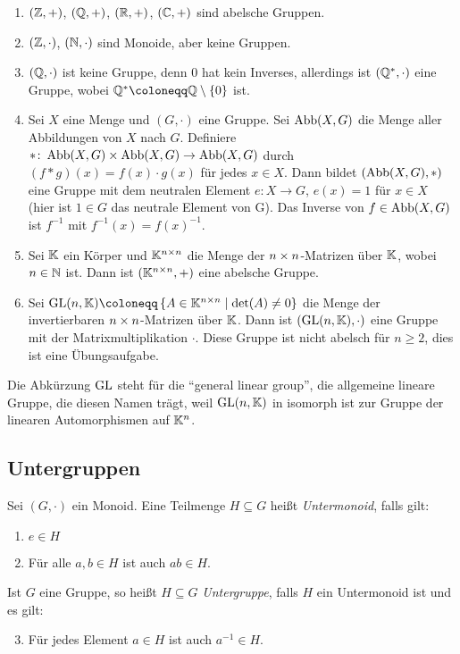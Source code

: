 {\begin{example}
  \leavevmode \vspace{-\baselineskip}
  \begin{enumerate}
    \item $(\mathbb{Z},+)$, $(\mathbb{Q},+)$, $(\mathbb{R},+)$, $(\mathbb{C},+)$ sind abelsche Gruppen.
    \item $(\mathbb{Z},\cdot)$, $(\mathbb{N},\cdot)$ sind Monoide, aber keine Gruppen.
    \item $(\mathbb{Q},\cdot)$ ist keine Gruppe, denn $0$ hat kein Inverses, allerdings ist $(\mathbb{Q}^*,\cdot)$ eine Gruppe, wobei $\QQ^* \coloneqq \QQ \setminus \setdef{0}$ ist.
    \item Sei $X$ eine Menge und $(G,\cdot)$ eine Gruppe. Sei $\operatorname{Abb}(X,G)$ die Menge aller Abbildungen von $X$ nach $G$. Definiere $* \colon \operatorname{Abb}(X,G) \times \operatorname{Abb}(X,G) \rightarrow \operatorname{Abb}(X,G)$ durch $(f * g)(x) = f(x) \cdot g(x)$ für jedes $x \in X$.
    Dann bildet $(\operatorname{Abb}(X,G),*)$ eine Gruppe mit dem neutralen Element $e \colon X \rightarrow G$, $e(x) = 1$ für $x \in X$ (hier ist $1 \in G$ das neutrale Element von G). Das Inverse von $f \in \operatorname{Abb}(X,G)$ ist $f^{-1}$ mit $f^{-1}(x) = f(x)^{-1}$.
    \item Sei $\mathbb{K}$ ein Körper und $\mathbb{K}^{n \times n}$ die Menge der ${n \times n}$-Matrizen über $\mathbb{K}$, wobei $n \in \mathbb{N}$ ist. Dann ist $(\mathbb{K}^{n \times n},+)$ eine abelsche Gruppe.
    \item Sei $\GL(n,\KK) \coloneqq \left\{ A \in \KK^\nn \suchthat \det(A) \neq 0 \right\}$ die Menge der invertierbaren ${n \times n}$-Matrizen über $\mathbb{K}$. Dann ist $(\operatorname{GL}(n,\mathbb{K}),\cdot)$ eine Gruppe mit der Matrixmultiplikation $\cdot$. Diese Gruppe ist nicht abelsch für $n \geq 2$, dies ist eine Übungsaufgabe.
  \end{enumerate}
\end{example}

Die Abkürzung $\operatorname{GL}$ steht für die \enquote{general linear group}, die allgemeine lineare Gruppe, die diesen Namen trägt, weil $\operatorname{GL}(n,\mathbb{K})$ in isomorph ist zur Gruppe der linearen Automorphismen auf $\mathbb{K}^n$.

\subsection{Untergruppen}

\begin{definition}\label{def:algebra:untergruppe}
  Sei $(G,\cdot)$ ein Monoid. Eine Teilmenge $H \subseteq G$ heißt \emph{Untermonoid}, falls gilt:
  \begin{enumerate}
    \item $e \in H$
    \item Für alle $a, b \in H$ ist auch $ab \in H$.
  \end{enumerate}
  Ist $G$ eine Gruppe, so heißt $H \subseteq G$ \emph{Untergruppe}, falls $H$ ein Untermonoid ist und es gilt:
  \begin{enumerate}\setcounter{enumi}{2}
    \item Für jedes Element $a \in H$ ist auch $a^{-1} \in H$.
  \end{enumerate}
\end{definition}

}
